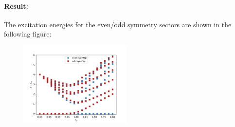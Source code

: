 \documentclass[]{article}
\theoremstyle{definition}
\begin{document}
\begin{enumerate}
  \paragraph{Result:}
  The excitation energies for the even/odd symmetry sectors are shown
  in the following figure:
  \begin{figure}[H]
    \centering
    \includegraphics[width=0.5\textwidth]{spectra_tfi_12_spinflip.pdf}
  \end{figure}  
\end{enumerate}

\end{document}
